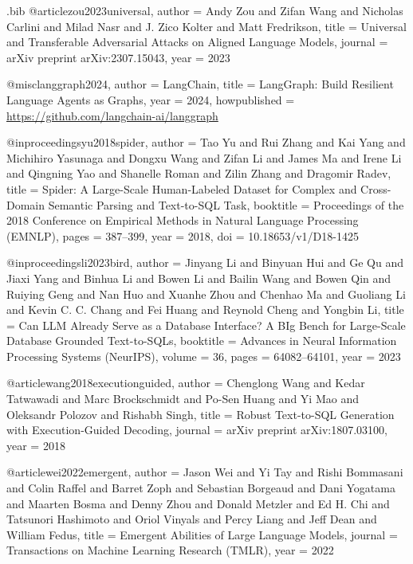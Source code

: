 \begin{filecontents*}{\jobname.bib}
@article{zou2023universal,
  author    = {Andy Zou and Zifan Wang and Nicholas Carlini and Milad Nasr and J. Zico Kolter and Matt Fredrikson},
  title     = {Universal and Transferable Adversarial Attacks on Aligned Language Models},
  journal   = {arXiv preprint arXiv:2307.15043},
  year      = {2023}
}

@misc{langgraph2024,
  author       = {{LangChain}},
  title        = {{LangGraph}: Build Resilient Language Agents as Graphs},
  year         = {2024},
  howpublished = {\url{https://github.com/langchain-ai/langgraph}}
}

@inproceedings{yu2018spider,
  author    = {Tao Yu and Rui Zhang and Kai Yang and Michihiro Yasunaga and Dongxu Wang and Zifan Li and James Ma and Irene Li and Qingning Yao and Shanelle Roman and Zilin Zhang and Dragomir Radev},
  title     = {Spider: A Large-Scale Human-Labeled Dataset for Complex and Cross-Domain Semantic Parsing and Text-to-{SQL} Task},
  booktitle = {Proceedings of the 2018 Conference on Empirical Methods in Natural Language Processing (EMNLP)},
  pages     = {387--399},
  year      = {2018},
  doi       = {10.18653/v1/D18-1425}
}

@inproceedings{li2023bird,
  author    = {Jinyang Li and Binyuan Hui and Ge Qu and Jiaxi Yang and Binhua Li and Bowen Li and Bailin Wang and Bowen Qin and Ruiying Geng and Nan Huo and Xuanhe Zhou and Chenhao Ma and Guoliang Li and Kevin C. C. Chang and Fei Huang and Reynold Cheng and Yongbin Li},
  title     = {Can {LLM} Already Serve as a Database Interface? {A} {BIg} Bench for Large-Scale Database Grounded Text-to-{SQL}s},
  booktitle = {Advances in Neural Information Processing Systems (NeurIPS)},
  volume    = {36},
  pages     = {64082--64101},
  year      = {2023}
}

@article{wang2018executionguided,
  author    = {Chenglong Wang and Kedar Tatwawadi and Marc Brockschmidt and Po-Sen Huang and Yi Mao and Oleksandr Polozov and Rishabh Singh},
  title     = {Robust Text-to-{SQL} Generation with Execution-Guided Decoding},
  journal   = {arXiv preprint arXiv:1807.03100},
  year      = {2018}
}

@article{wei2022emergent,
  author    = {Jason Wei and Yi Tay and Rishi Bommasani and Colin Raffel and Barret Zoph and Sebastian Borgeaud and Dani Yogatama and Maarten Bosma and Denny Zhou and Donald Metzler and Ed H. Chi and Tatsunori Hashimoto and Oriol Vinyals and Percy Liang and Jeff Dean and William Fedus},
  title     = {Emergent Abilities of Large Language Models},
  journal   = {Transactions on Machine Learning Research (TMLR)},
  year      = {2022}
}
\end{filecontents*}


